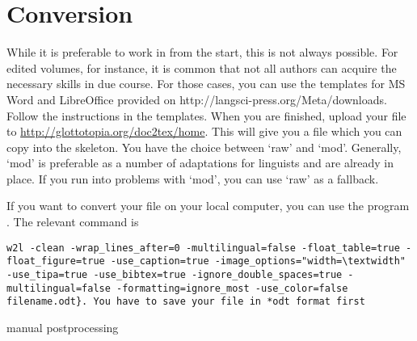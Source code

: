 \chapter{Conversion} 
While it is preferable to work in \latex from the start, this is not always possible. For edited volumes, for instance, it is common that not all authors can acquire the necessary skills in due course. For those cases, you can use the templates for MS Word and LibreOffice provided on http://langsci-press.org/Meta/downloads. Follow the instructions in the templates. When you are finished, upload your file to \url{http://glottotopia.org/doc2tex/home}. This will give you a file which you can copy into the skeleton. You have the choice between `raw' and `mod'. Generally, `mod' is preferable as a number of adaptations for linguists and \lsp are already in place. If you run into problems with `mod', you can use `raw' as a fallback.


If you want to convert your file on your local computer, you can use the program . The relevant command is \begin{verbatim}
w2l -clean -wrap_lines_after=0 -multilingual=false -float_table=true -float_figure=true -use_caption=true -image_options="width=\textwidth" -use_tipa=true -use_bibtex=true -ignore_double_spaces=true -multilingual=false -formatting=ignore_most -use_color=false filename.odt}. You have to save your file in *odt format first                       
                                                                                                                                  \end{verbatim}
manual postprocessing
